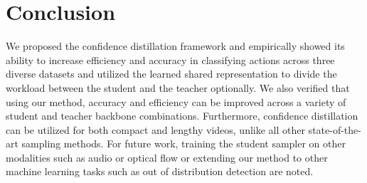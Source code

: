 \documentclass[a4paper,conference]{IEEEtran}
\begin{document}
\section{Conclusion}

We proposed the confidence distillation framework and empirically showed its ability to increase efficiency and accuracy in classifying actions across three diverse datasets and utilized the learned shared representation to divide the workload between the student and the teacher optionally. We also verified that using our method, accuracy and efficiency can be improved across a variety of student and teacher backbone combinations. Furthermore, confidence distillation can be utilized for both compact and lengthy videos, unlike all other state-of-the-art sampling methods. For future work, training the student sampler on other modalities such as audio or optical flow or extending our method to other machine learning tasks such as out of distribution detection are noted. 


\newpage




\end{document}
